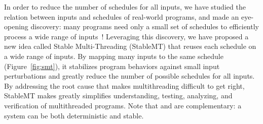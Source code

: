 
In order to reduce the number of schedules for all inputs, we have studied the
relation between inputs and schedules of real-world programs, and made an
eye-opening discovery: many programs need only a small set of schedules to
efficiently process a wide range of inputs~\cite{smt:cacm}! Leveraging this
discovery, we have proposed a new idea called Stable Multi-Threading (StableMT)
that reuses each schedule on a wide range of inputs. By mapping many inputs to
the same schedule (Figure~\ref{fig:smt}), it stabilizes program behaviors
against small input perturbations and greatly reduce the number of possible
schedules for all inputs. By addressing the root cause that makes multithreading
difficult to get right, StableMT makes greatly simplifies understanding,
testing, analyzing, and verification of multithreaded programs. Note that \smt
and \dmt are complementary: a system can be both deterministic and stable.

